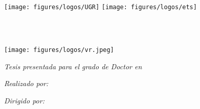 \begin{titlepage}
\begin{center}

\vspace*{.04\textheight}
\texttt{[image: figures/logos/UGR]}\hspace{2cm}
\texttt{[image: figures/logos/ets]}\\
\vspace{.5cm}

\HRule \\[0.6cm] %
{\huge \bfseries \ttitle\par}\vspace{0.3cm} %
\HRule \\[.7cm] %

    \texttt{[image: figures/logos/vr.jpeg]}

\large \textit{Tesis presentada para el grado de Doctor en \degreename}\\[0.3cm]
\vspace{1.0cm}
\begin{minipage}[t]{0.4\textwidth}
\begin{flushleft} \large
\emph{Realizado por:}\\
{\authorname} %
\end{flushleft}
\end{minipage}
\begin{minipage}[t]{0.4\textwidth}
\begin{flushright} \large
\emph{Dirigido por:} \\
\supname
\end{flushright}
\end{minipage}\\[2cm]
 


\end{center}
\end{titlepage}
